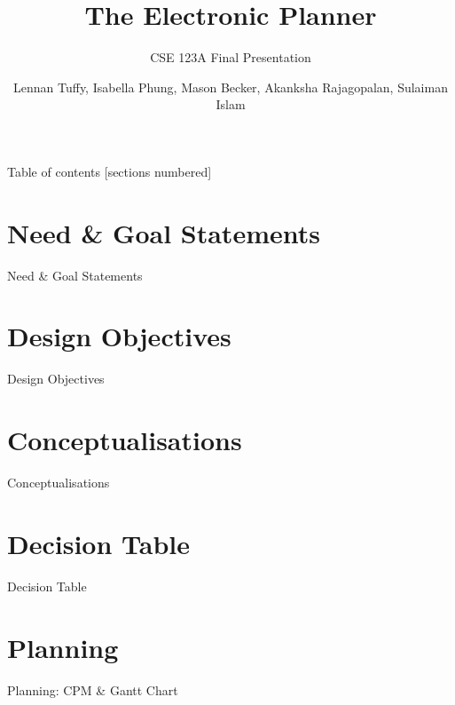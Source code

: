 \documentclass[10pt]{beamer}
\title{The Electronic Planner}
\subtitle{CSE 123A Final Presentation}
\date{}
\author{Lennan Tuffy, Isabella Phung, Mason Becker, Akanksha Rajagopalan, Sulaiman Islam}
\institute{UCSC}
\begin{document}
\maketitle

\begin{frame}{Table of contents}
  [sections numbered]
  \tableofcontents
\end{frame}

\section{Need \& Goal Statements}

\begin{frame}{Need \& Goal Statements}
\end{frame}

\section{Design Objectives}

\begin{frame}{Design Objectives}
\end{frame}

\section{Conceptualisations}

\begin{frame}{Conceptualisations}
\end{frame}

\section{Decision Table}

\begin{frame}{Decision Table}
\end{frame}

\section{Planning}

\begin{frame}{Planning: CPM \& Gantt Chart}
\end{frame}
\end{document}
